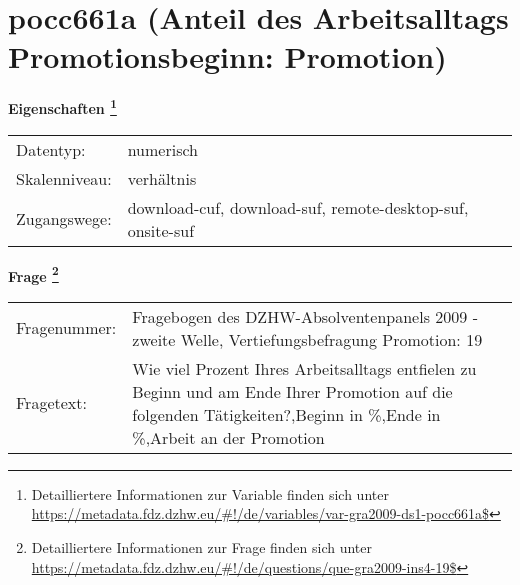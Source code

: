 
    \setcounter{footnote}{0}

    \vspace*{-1.8cm}
	\section{pocc661a (Anteil des Arbeitsalltags Promotionsbeginn: Promotion)}
	\label{section:pocc661a}



    \vspace*{0.5cm}
    \noindent\textbf{Eigenschaften
	\footnote{Detailliertere Informationen zur Variable finden sich unter
		\url{https://metadata.fdz.dzhw.eu/\#!/de/variables/var-gra2009-ds1-pocc661a$}}}\\
	\begin{tabularx}{\hsize}{@{}lX}
	Datentyp: & numerisch \\
	Skalenniveau: & verhältnis \\
	Zugangswege: &
	  download-cuf, 
	  download-suf, 
	  remote-desktop-suf, 
	  onsite-suf
 \\
    \end{tabularx}



				\vspace*{0.5cm}
                \noindent\textbf{Frage
	                \footnote{Detailliertere Informationen zur Frage finden sich unter
		              \url{https://metadata.fdz.dzhw.eu/\#!/de/questions/que-gra2009-ins4-19$}}}\\
				\begin{tabularx}{\hsize}{@{}lX}
					Fragenummer: &
					  Fragebogen des DZHW-Absolventenpanels 2009 - zweite Welle, Vertiefungsbefragung Promotion:
					  19
 \\
					Fragetext: & Wie viel Prozent Ihres Arbeitsalltags entfielen zu Beginn und am Ende Ihrer Promotion auf die folgenden Tätigkeiten?,Beginn in \%,Ende in \%,Arbeit an der Promotion \\
				\end{tabularx}





